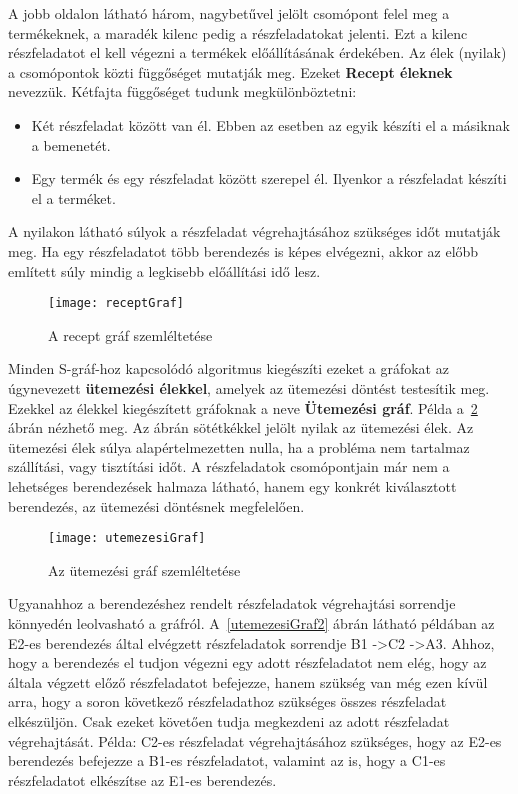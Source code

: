 A jobb oldalon látható három, nagybetűvel jelölt csomópont felel meg a termékeknek, a maradék kilenc pedig a részfeladatokat jelenti. Ezt a kilenc részfeladatot el kell végezni a termékek előállításának érdekében. Az élek (nyilak) a csomópontok közti függőséget mutatják meg. Ezeket \textbf{Recept éleknek} nevezzük. Kétfajta függőséget tudunk megkülönböztetni:
\begin{itemize}
  \item Két részfeladat között van él. Ebben az esetben az egyik készíti el a másiknak a bemenetét.
  \item Egy termék és egy részfeladat között szerepel él. Ilyenkor a részfeladat készíti el a terméket.
\end{itemize}
A nyilakon látható súlyok a részfeladat végrehajtásához szükséges időt mutatják meg. Ha egy részfeladatot több berendezés is képes elvégezni, akkor az előbb említett súly mindig a legkisebb előállítási idő lesz.
\begin{figure}[H]	
\begin{center}
\texttt{[image: receptGraf]}
\caption{A recept gráf szemléltetése}
\label{receptGraf}
\end{center}
\end{figure}
Minden S-gráf-hoz kapcsolódó algoritmus kiegészíti ezeket a gráfokat az úgynevezett \textbf{ütemezési élekkel}, amelyek az ütemezési döntést testesítik meg. Ezekkel az élekkel kiegészített gráfoknak a neve \textbf{Ütemezési gráf}. Példa a~\ref{utemezesiGraf} ábrán nézhető meg. Az ábrán sötétkékkel jelölt nyilak az ütemezési élek. Az ütemezési élek súlya alapértelmezetten nulla, ha a probléma nem tartalmaz szállítási, vagy tisztítási időt. A részfeladatok csomópontjain már nem a lehetséges berendezések halmaza látható, hanem egy konkrét kiválasztott berendezés, az ütemezési döntésnek megfelelően. 
\begin{figure}[H]
\begin{center}
\texttt{[image: utemezesiGraf]}
\caption{Az ütemezési gráf szemléltetése}
\label{utemezesiGraf}
\end{center}
\end{figure}
Ugyanahhoz a berendezéshez rendelt részfeladatok végrehajtási sorrendje könnyedén leolvasható a gráfról. A~\ref{utemezesiGraf2} ábrán látható példában az E2-es berendezés által elvégzett részfeladatok sorrendje B1 -\textgreater  C2 -\textgreater  A3. Ahhoz, hogy a berendezés el tudjon végezni egy adott részfeladatot nem elég, hogy az általa végzett előző részfeladatot befejezze, hanem szükség van még ezen kívül arra, hogy a soron következő részfeladathoz szükséges összes részfeladat elkészüljön. Csak ezeket követően tudja megkezdeni az adott részfeladat végrehajtását. Példa: C2-es részfeladat végrehajtásához szükséges, hogy az E2-es berendezés befejezze a B1-es részfeladatot, valamint az is, hogy a C1-es részfeladatot elkészítse az E1-es berendezés.
